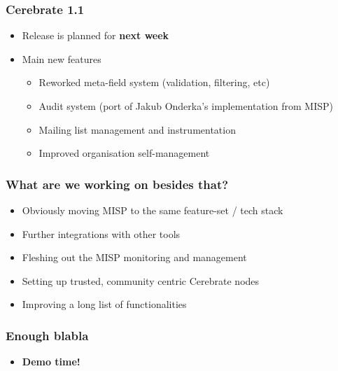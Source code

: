 \begin{frame}
	\frametitle{Cerebrate 1.1}
	\begin{itemize}
            \item Release is planned for {\bf next week}
            \item Main new features
            \begin{itemize}
                \item Reworked meta-field system (validation, filtering, etc)
                \item Audit system (port of Jakub Onderka's implementation from MISP)
                \item Mailing list management and instrumentation
                \item Improved organisation self-management
            \end{itemize}
	\end{itemize}
\end{frame}

\begin{frame}
	\frametitle{What are we working on besides that?}
	\begin{itemize}
                \item Obviously moving MISP to the same feature-set / tech stack
                \item Further integrations with other tools
                \item Fleshing out the MISP monitoring and management
                \item Setting up trusted, community centric Cerebrate nodes
                \item Improving a long list of functionalities
	\end{itemize}
\end{frame}

\begin{frame}
	\frametitle{Enough blabla}
	\begin{itemize}
                \item {\bf Demo time!}
	\end{itemize}
\end{frame}
